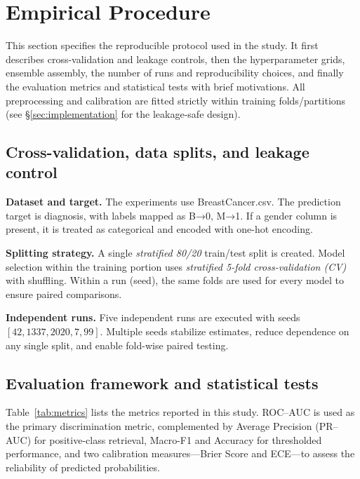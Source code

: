 \documentclass[conference]{IEEEtran}
\begin{document}
\section{\textbf{Empirical Procedure}}
\label{sec:empirical}

This section specifies the reproducible protocol used in the study. It first describes cross-validation and leakage controls, then the hyperparameter grids, ensemble assembly, the number of runs and reproducibility choices, and finally the evaluation metrics and statistical tests with brief motivations. All preprocessing and calibration are fitted strictly within training folds/partitions (see \S\ref{sec:implementation} for the leakage-safe design).

\subsection{Cross-validation, data splits, and leakage control}

\textbf{Dataset and target.}
The experiments use BreastCancer.csv. The prediction target is diagnosis, with labels mapped as {B→0, M→1}. If a gender column is present, it is treated as categorical and encoded with one-hot encoding.

\textbf{Splitting strategy.}
A single \emph{stratified 80/20} train/test split is created.
Model selection within the training portion uses \emph{stratified 5-fold cross-validation (CV)} with shuffling.
Within a run (seed), the same folds are used for every model to ensure paired comparisons.

\textbf{Independent runs.}
Five independent runs are executed with seeds \([42, 1337, 2020, 7, 99]\).
Multiple seeds stabilize estimates, reduce dependence on any single split, and enable fold-wise paired testing.


\subsection{Evaluation framework and statistical tests}

Table~\ref{tab:metrics} lists the metrics reported in this study. ROC--AUC is used as the primary discrimination metric, complemented by Average Precision (PR--AUC) for positive-class retrieval, Macro-F1 and Accuracy for thresholded performance, and two calibration measures—Brier Score and ECE—to assess the reliability of predicted probabilities.
\end{document}
